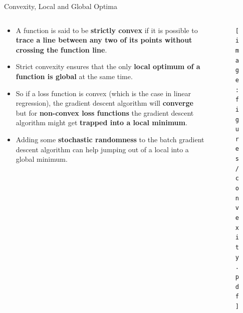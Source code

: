 \documentclass[main.tex]{subfiles}
\begin{document}
    \begin{frame}{Convexity, Local and Global Optima}
        \begin{columns}
            \begin{column}{0.6\textwidth}
                \begin{itemize}
                    \item A function is said to be \textbf{strictly convex} if it is possible to \textbf{trace a line between any two of its points without crossing the function line}.
                    \item Strict convexity ensures that the only \textbf{local optimum of a function is global} at the same time. \item So if a loss function is convex (which is the case in linear regression), the gradient descent algorithm will \textbf{converge} but for \textbf{non-convex loss functions} the gradient descent algorithm might get \textbf{trapped into a local minimum}.
                    \item Adding some \textbf{stochastic randomness} to the batch gradient descent algorithm can help jumping out of a local into a global minimum.
                \end{itemize}
            \end{column}
            \begin{column}{0.4\textwidth}
                \begin{figure}
                    \label{fig:convexity}
                    \texttt{[image: figures/convexity.pdf]}
                \end{figure}
            \end{column}
        \end{columns}	
    \end{frame}
\end{document}
